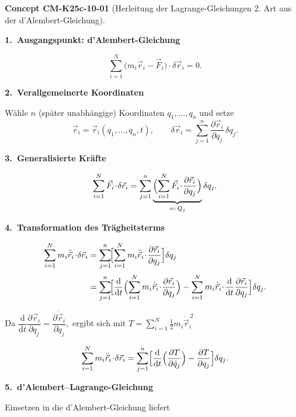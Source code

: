 \documentclass[10pt, letterpaper]{article}
\newcommand{\CustomHeading}[3]{%
  \par\medskip\noindent%
  \textbf{#1 #2} \textnormal{(#3)}.\enskip%
}
\newenvironment{CONC}[2]{\CustomHeading{Concept}{#1}{#2}}{}
\begin{document}
\begin{CONC}{CM-K25c-10-01}{Herleitung der Lagrange-Gleichungen 2. Art aus der d’Alembert-Gleichung}
\textbf{1.\ Ausgangspunkt: d’Alembert-Gleichung}

\[
  \sum_{i=1}^{N}\bigl(m_i\ddot{\vec r}_i-\vec F_i\bigr)\!\cdot\!\delta\vec r_i=0.
\]

\textbf{2.\ Verallgemeinerte Koordinaten}

Wähle $n$ (später unabhängige) Koordinaten $q_1,\dots,q_n$  
und setze
\[
  \vec r_i=\vec r_i(q_1,\dots,q_n,t),
  \qquad
  \delta\vec r_i=\sum_{j=1}^{n}
                  \frac{\partial\vec r_i}{\partial q_j}\,\delta q_j.
\]

\textbf{3.\ Generalisierte Kräfte}

\[
  \sum_{i=1}^{N}\vec F_i\!\cdot\!\delta\vec r_i
  =\sum_{j=1}^{n}
     \underbrace{\Bigl(
       \sum_{i=1}^{N}\vec F_i\!\cdot\!
       \frac{\partial\vec r_i}{\partial q_j}
     \Bigr)}_{=:\,Q_j}
     \delta q_j.
\]

\textbf{4.\ Transformation des Trägheitsterms}

\[
\begin{aligned}
  \sum_{i=1}^{N}m_i\ddot{\vec r}_i\!\cdot\!\delta\vec r_i
  &=\sum_{j=1}^{n}\!
     \Bigl[
       \sum_{i=1}^{N}
         m_i\ddot{\vec r}_i\!\cdot\!
         \frac{\partial\vec r_i}{\partial q_j}
     \Bigr]\delta q_j\\[2pt]
  &=\sum_{j=1}^{n}\!
     \Bigl[
       \frac{\mathrm d}{\mathrm dt}
         \Bigl(
           \sum_{i=1}^{N}
             m_i\dot{\vec r}_i\!\cdot\!
             \frac{\partial\vec r_i}{\partial q_j}
         \Bigr)
       -
       \sum_{i=1}^{N}
         m_i\dot{\vec r}_i\!\cdot\!
         \frac{\mathrm d}{\mathrm dt}
           \frac{\partial\vec r_i}{\partial q_j}
     \Bigr]\delta q_j .
\end{aligned}
\]

Da
\(
  \dfrac{\mathrm d}{\mathrm dt}
  \dfrac{\partial\vec r_i}{\partial q_j}
  =
  \dfrac{\partial\dot{\vec r}_i}{\partial q_j},
\)
ergibt sich mit
\(
  T=\sum_{i=1}^{N}\tfrac12m_i\dot{\vec r}_i^{\,2}
\)

\[
  \sum_{i=1}^{N}m_i\ddot{\vec r}_i\!\cdot\!\delta\vec r_i
  =
  \sum_{j=1}^{n}
    \Bigl[
      \frac{\mathrm d}{\mathrm dt}
        \Bigl(\frac{\partial T}{\partial\dot q_j}\Bigr)
      -
      \frac{\partial T}{\partial q_j}
    \Bigr]\delta q_j .
\]

\textbf{5.\ d’Alembert–Lagrange-Gleichung}

Einsetzen in die d’Alembert-Gleichung liefert


\end{CONC}
\end{document}
